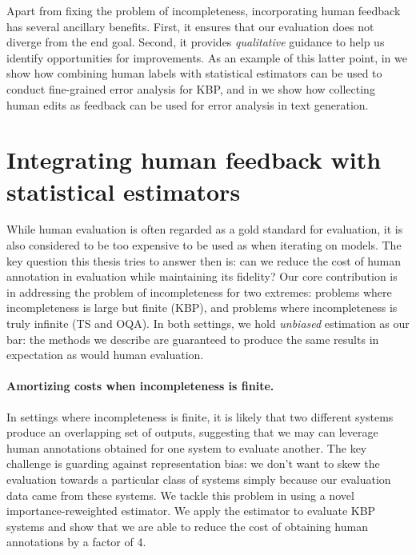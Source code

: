 Apart from fixing the problem of incompleteness, incorporating human feedback has several ancillary benefits.
First, it ensures that our evaluation does not diverge from the end goal.
Second, it provides \textit{qualitative} guidance to help us identify opportunities for improvements.
As an example of this latter point, in  we show how combining human labels with statistical estimators can be used to conduct fine-grained error analysis for KBP, and in  we show how collecting human edits as feedback can be used for error analysis in text generation.


\section{Integrating human feedback with statistical estimators}
While human evaluation is often regarded as a gold standard for evaluation, it is also considered to be too expensive to be used as when iterating on models.
The key question this thesis tries to answer then is: can we reduce the cost of human annotation in evaluation while maintaining its fidelity?
Our core contribution is in addressing the problem of incompleteness for two extremes: problems where incompleteness is large but finite (KBP), and problems where incompleteness is truly infinite (TS and OQA).
In both settings, we hold \textit{unbiased} estimation as our bar: the methods we describe are guaranteed to produce the same results in expectation as would human evaluation.

\paragraph{Amortizing costs when incompleteness is finite.}
In settings where incompleteness is finite, it is likely that two different systems produce an overlapping set of outputs, suggesting that we may can leverage human annotations obtained for one system to evaluate another.
The key challenge is guarding against representation bias: we don't want to skew the evaluation towards a particular class of systems simply because our evaluation data came from these systems.
We tackle this problem in  using a novel importance-reweighted estimator. We apply the estimator to evaluate KBP systems and show that we are able to reduce the cost of obtaining human annotations by a factor of 4.

